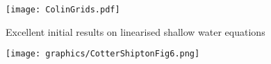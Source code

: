 \begin{slide}
\texttt{[image: ColinGrids.pdf]}
\end{slide}


\begin{slide}
\begin{minipage}{0.38\linewidth}
\begin{list0}
\item Excellent initial results on linearised shallow water equations
\end{list0}
\end{minipage}
\hfill
\begin{minipage}{0.6\linewidth}
\texttt{[image: graphics/CotterShiptonFig6.png]}
\end{minipage}

\end{slide}

